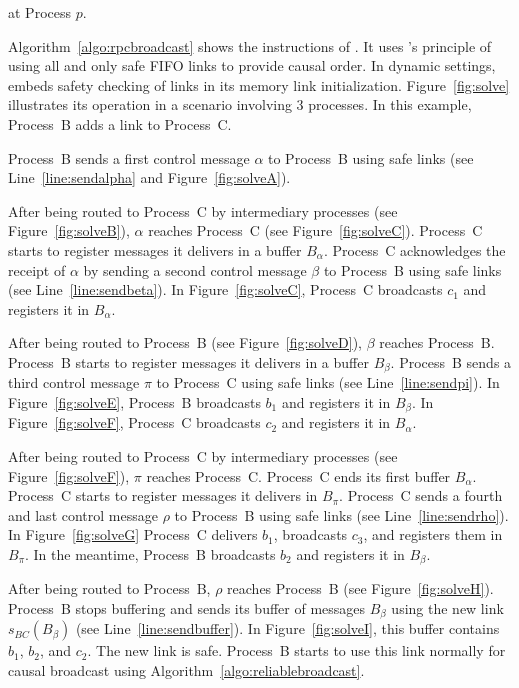 \begin{algorithm}[h]
  
  \caption{\label{algo:rpcbroadcast}\RPCBROADCAST at Process $p$.}
\end{algorithm}

Algorithm~\ref{algo:rpcbroadcast} shows the instructions of \RPCBROADCAST.  It
uses \PCBROADCAST's principle of using all and only safe FIFO links to provide
causal order.  In dynamic settings, \RPCBROADCAST embeds safety checking of
links in its memory link initialization.
Figure~\ref{fig:solve} illustrates its operation in a scenario involving 3
processes. In this example, Process~B adds a link to Process~C.

\noindent Process~B sends a first control message $\alpha$ to Process~B using
safe links (see Line~\ref{line:sendalpha} and Figure~\ref{fig:solveA}).

\noindent After being routed to Process~C by intermediary processes (see
Figure~\ref{fig:solveB}), $\alpha$ reaches Process~C (see
Figure~\ref{fig:solveC}).  Process~C starts to register messages it delivers in
a buffer $B_\alpha$.  Process~C acknowledges the receipt of $\alpha$ by sending
a second control message $\beta$ to Process~B using safe links (see
Line~\ref{line:sendbeta}). In Figure~\ref{fig:solveC}, Process~C broadcasts
$c_1$ and registers it in $B_\alpha$.

\noindent After being routed to Process~B (see Figure~\ref{fig:solveD}), $\beta$
reaches Process~B. Process~B starts to register messages it delivers in a buffer
$B_\beta$. Process~B sends a third control message $\pi$ to Process~C using safe
links (see Line~\ref{line:sendpi}). In Figure~\ref{fig:solveE}, Process~B
broadcasts $b_1$ and registers it in $B_\beta$. In Figure~\ref{fig:solveF},
Process~C broadcasts $c_2$ and registers it in $B_\alpha$.

\noindent After being routed to Process~C by intermediary processes (see
Figure~\ref{fig:solveF}), $\pi$ reaches Process~C. Process~C ends its first
buffer $B_\alpha$.  Process~C starts to register messages it delivers in
$B_\pi$.  Process~C sends a fourth and last control message $\rho$ to Process~B
using safe links (see Line~\ref{line:sendrho}). In Figure~\ref{fig:solveG}
Process~C delivers $b_1$, broadcasts $c_3$, and registers them in $B_\pi$. In
the meantime, Process~B broadcasts $b_2$ and registers it in $B_\beta$.

\noindent After being routed to Process~B, $\rho$ reaches Process~B (see
Figure~\ref{fig:solveH}).  Process~B stops buffering and sends its buffer of
messages $B_\beta$ using the new link $s_{BC}(B_\beta)$ (see
Line~\ref{line:sendbuffer}). In Figure~\ref{fig:solveI}, this buffer contains
$b_1$, $b_2$, and $c_2$. The new link is safe. Process~B starts to use this link
normally for causal broadcast using Algorithm~\ref{algo:reliablebroadcast}.

